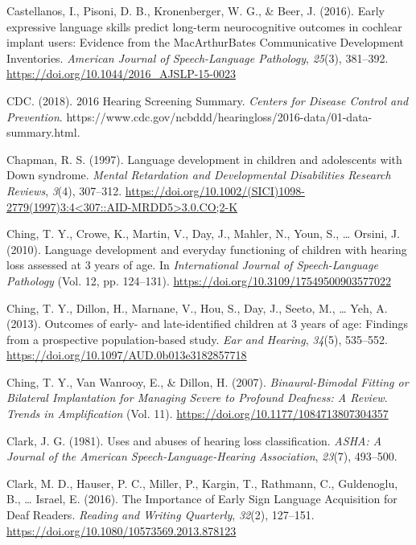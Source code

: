 \documentclass[english,man]{apa6}
\begin{document}
\leavevmode\hypertarget{ref-castellanos2016}{}%
Castellanos, I., Pisoni, D. B., Kronenberger, W. G., \& Beer, J. (2016). Early expressive language skills predict long-term neurocognitive outcomes in cochlear implant users: Evidence from the MacArthurBates Communicative Development Inventories. \emph{American Journal of Speech-Language Pathology}, \emph{25}(3), 381--392. \url{https://doi.org/10.1044/2016_AJSLP-15-0023}

\leavevmode\hypertarget{ref-cdc2018}{}%
CDC. (2018). 2016 Hearing Screening Summary. \emph{Centers for Disease Control and Prevention}. https://www.cdc.gov/ncbddd/hearingloss/2016-data/01-data-summary.html.

\leavevmode\hypertarget{ref-chapman1997}{}%
Chapman, R. S. (1997). Language development in children and adolescents with Down syndrome. \emph{Mental Retardation and Developmental Disabilities Research Reviews}, \emph{3}(4), 307--312. \href{https://doi.org/10.1002/(SICI)1098-2779(1997)3:4\%3C307::AID-MRDD5\%3E3.0.CO;2-K}{https://doi.org/10.1002/(SICI)1098-2779(1997)3:4\textless{}307::AID-MRDD5\textgreater{}3.0.CO;2-K}

\leavevmode\hypertarget{ref-ching2010}{}%
Ching, T. Y., Crowe, K., Martin, V., Day, J., Mahler, N., Youn, S., \ldots{} Orsini, J. (2010). Language development and everyday functioning of children with hearing loss assessed at 3 years of age. In \emph{International Journal of Speech-Language Pathology} (Vol. 12, pp. 124--131). \url{https://doi.org/10.3109/17549500903577022}

\leavevmode\hypertarget{ref-ching2013}{}%
Ching, T. Y., Dillon, H., Marnane, V., Hou, S., Day, J., Seeto, M., \ldots{} Yeh, A. (2013). Outcomes of early- and late-identified children at 3 years of age: Findings from a prospective population-based study. \emph{Ear and Hearing}, \emph{34}(5), 535--552. \url{https://doi.org/10.1097/AUD.0b013e3182857718}

\leavevmode\hypertarget{ref-ching2007}{}%
Ching, T. Y., Van Wanrooy, E., \& Dillon, H. (2007). \emph{Binaural-Bimodal Fitting or Bilateral Implantation for Managing Severe to Profound Deafness: A Review}. \emph{Trends in Amplification} (Vol. 11). \url{https://doi.org/10.1177/1084713807304357}

\leavevmode\hypertarget{ref-clark1981}{}%
Clark, J. G. (1981). Uses and abuses of hearing loss classification. \emph{ASHA: A Journal of the American Speech-Language-Hearing Association}, \emph{23}(7), 493--500.

\leavevmode\hypertarget{ref-clark2016}{}%
Clark, M. D., Hauser, P. C., Miller, P., Kargin, T., Rathmann, C., Guldenoglu, B., \ldots{} Israel, E. (2016). The Importance of Early Sign Language Acquisition for Deaf Readers. \emph{Reading and Writing Quarterly}, \emph{32}(2), 127--151. \url{https://doi.org/10.1080/10573569.2013.878123}
\end{document}
